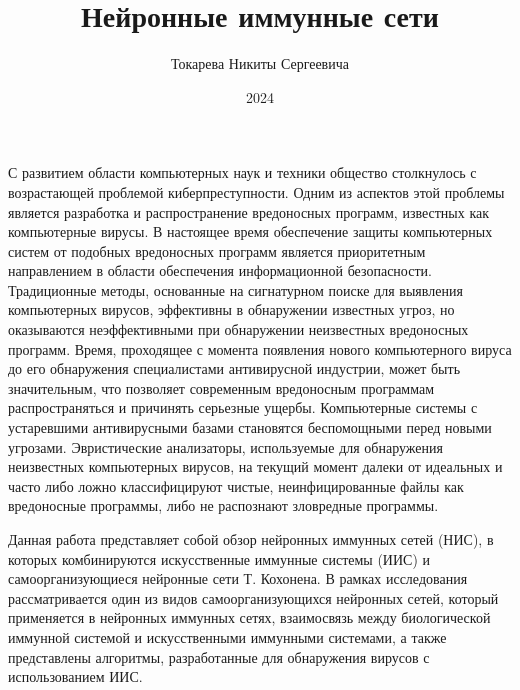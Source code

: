 \documentclass[bachelor, och, referat]{template}
\begin{document}
\title{Нейронные иммунные сети}





\author{Токарева Никиты Сергеевича}




\date{2024}

\maketitle



\tableofcontents

\intro
С развитием области компьютерных наук и техники общество столкнулось с 
возрастающей проблемой киберпреступности. Одним из аспектов этой проблемы 
является разработка и распространение вредоносных программ, известных как 
компьютерные вирусы. В настоящее время обеспечение защиты компьютерных 
систем от подобных вредоносных программ является приоритетным направлением 
в области обеспечения информационной безопасности. Традиционные методы, 
основанные на сигнатурном поиске для выявления компьютерных вирусов, 
эффективны в обнаружении известных угроз, но оказываются неэффективными 
при обнаружении неизвестных вредоносных программ. Время, проходящее с 
момента появления нового компьютерного вируса до его обнаружения 
специалистами антивирусной индустрии, может быть значительным, 
что позволяет современным вредоносным программам распространяться 
и причинять серьезные ущербы. Компьютерные системы с устаревшими 
антивирусными базами становятся беспомощными перед новыми угрозами. 
Эвристические анализаторы, используемые для обнаружения неизвестных 
компьютерных вирусов, на текущий момент далеки от идеальных и часто 
либо ложно классифицируют чистые, неинфицированные файлы как вредоносные 
программы, либо не распознают зловредные программы.

Данная работа представляет собой обзор нейронных иммунных сетей (НИС), в 
которых комбинируются искусственные иммунные системы (ИИС) и самоорганизующиеся 
нейронные сети Т. Кохонена. В рамках исследования рассматривается один из видов самоорганизующихся
нейронных сетей, который применяется в нейронных иммунных сетях, взаимосвязь между биологической 
иммунной системой и искусственными иммунными системами, а также представлены 
алгоритмы, разработанные для обнаружения вирусов с использованием ИИС.
\end{document}
